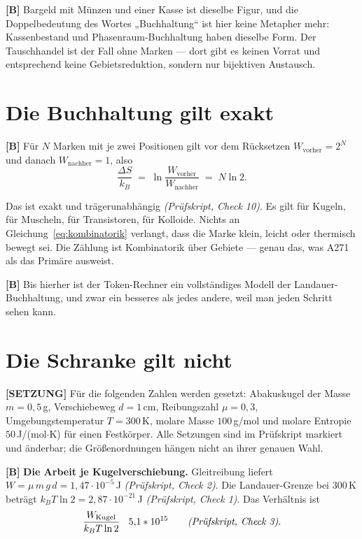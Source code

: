 \textbf{[B]} Bargeld mit Münzen und einer Kasse ist dieselbe Figur, und die Doppelbedeutung
des Wortes „Buchhaltung“ ist hier keine Metapher mehr: Kassenbestand und
Phasenraum-Buchhaltung haben dieselbe Form. Der Tauschhandel ist der Fall ohne
Marken --- dort gibt es keinen Vorrat und entsprechend keine Gebietsreduktion,
sondern nur bijektiven Austausch.

\section{Die Buchhaltung gilt exakt}

\textbf{[B]} Für $N$ Marken mit je zwei Positionen gilt vor dem Rücksetzen
$W_{\text{vorher}} = 2^N$ und danach $W_{\text{nachher}} = 1$, also
\begin{equation}
  \frac{\Delta S}{k_B} \;=\; \ln\frac{W_{\text{vorher}}}{W_{\text{nachher}}}
  \;=\; N \ln 2 .
  \label{eq:kombinatorik}
\end{equation}

Das ist exakt und trägerunabhängig \emph{(Prüfskript, Check 10)}. Es gilt für Kugeln, für
Muscheln, für Transistoren, für Kolloide. Nichts an
Gleichung~\eqref{eq:kombinatorik} verlangt, dass die Marke klein, leicht oder
thermisch bewegt sei. Die Zählung ist Kombinatorik über Gebiete --- genau das,
was A271 als das Primäre ausweist.

\textbf{[B]} Bis hierher ist der Token-Rechner ein vollständiges Modell der
Landauer-Buchhaltung, und zwar ein besseres als jedes andere, weil man jeden
Schritt sehen kann.

\section{Die Schranke gilt nicht}

\textbf{[SETZUNG]} Für die folgenden Zahlen werden gesetzt: Abakuskugel der Masse
$m = 0{,}5$\,g, Verschiebeweg $d = 1$\,cm, Reibungszahl $\mu = 0{,}3$,
Umgebungstemperatur $T = 300$\,K, molare Masse $100$\,g/mol und molare Entropie
$50$\,J/(mol$\cdot$K) für einen Festkörper. Alle Setzungen sind im Prüfskript
markiert und änderbar; die Größenordnungen hängen nicht an ihrer genauen Wahl.

\textbf{[B]} \textbf{Die Arbeit je Kugelverschiebung.} Gleitreibung liefert
$W = \mu\,m\,g\,d = 1{,}47\cdot10^{-5}$\,J \emph{(Prüfskript, Check 2)}. Die Landauer-Grenze
bei 300\,K beträgt $k_B T \ln 2 = 2{,}87\cdot10^{-21}$\,J \emph{(Prüfskript, Check 1)}. Das
Verhältnis ist
\begin{equation}
  \frac{W_{\text{Kugel}}}{k_B T \ln 2} \;\approx\; 5{,}1\cdot10^{15}
  \qquad \text{\emph{(Prüfskript, Check 3)}} .
\end{equation}

